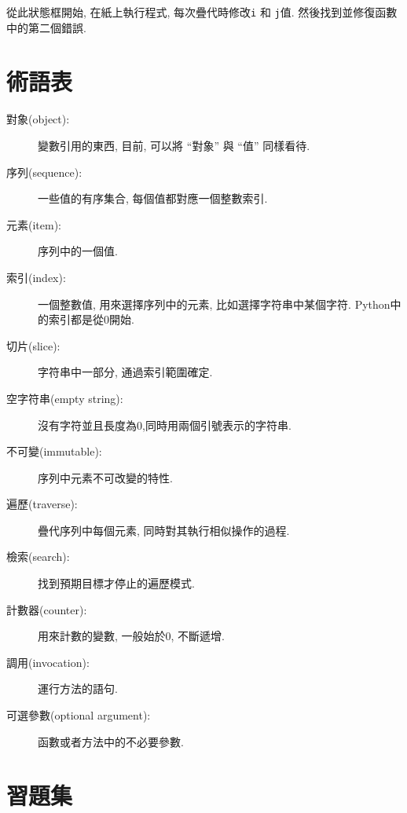 \documentclass[10pt]{book}
\begin{document}
從此狀態框開始, 在紙上執行程式, 每次疊代時修改{\tt i} 和 {\tt j}值. 
然後找到並修復函數中的第二個錯誤. 
\label{isreverse}


\section{術語表}

\begin{description}

\item[對象(object):] 變數引用的東西, 目前, 可以將
``對象'' 與 ``值'' 同樣看待. 

\item[序列(sequence):] 一些值的有序集合, 每個值都對應一個整數索引. 

\item[元素(item):] 序列中的一個值.

\item[索引(index):] 一個整數值, 用來選擇序列中的元素, 
比如選擇字符串中某個字符. Python中的索引都是從0開始. 

\item[切片(slice):] 字符串中一部分, 通過索引範圍確定. 

\item[空字符串(empty string):] 沒有字符並且長度為0,同時用兩個引號表示的字符串. 

\item[不可變(immutable):] 序列中元素不可改變的特性. 

\item[遍歷(traverse):] 疊代序列中每個元素, 同時對其執行相似操作的過程. 

\item[檢索(search):] 找到預期目標才停止的遍歷模式. 

\item[計數器(counter):] 用來計數的變數, 一般始於0, 不斷遞增. 

\item[調用(invocation):] 運行方法的語句.

\item[可選參數(optional argument):] 函數或者方法中的不必要參數. 

\end{description}


\section{習題集}
\end{document}
